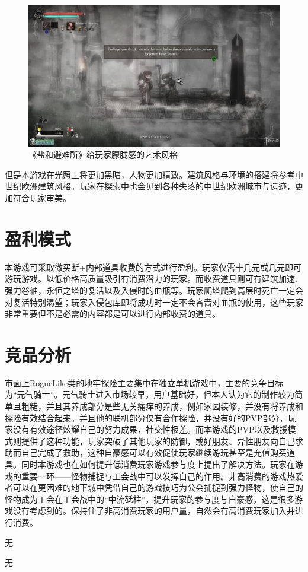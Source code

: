 \documentclass[UTF8,AutoFakeBold=1,AutoFakeSlant,zihao=-4]{cucthesis}
\begin{document}
\begin{figure}[ht]
    \centering
    \includegraphics[scale=1.0]{imgs/美术风格02.jpg}    
    \caption{《盐和避难所》给玩家朦胧感的艺术风格}
\end{figure}

但是本游戏在光照上将更加黑暗，人物更加精致。建筑风格与环境的搭建将参考中世纪欧洲建筑风格。玩家在探索中也会见到各种失落的中世纪欧洲城市与遗迹，更加符合玩家审美。


\section{盈利模式}
本游戏可采取微买断+内部道具收费的方式进行盈利。玩家仅需十几元或几元即可游玩游戏。以低价格高质量吸引有消费潜力的玩家。而收费道具则可有建筑加速、强力卷轴，永恒之塔的复活以及入侵时的血瓶等。玩家爬塔爬到高层时死亡一定会对复活特别渴望；玩家入侵包库即将成功时一定不会吝啬对血瓶的使用，这些玩家非常重要但不是必需的内容都是可以进行内部收费的道具。

\section{竞品分析}
市面上RogueLike类的地牢探险主要集中在独立单机游戏中，主要的竞争目标为“元气骑士”。元气骑士进入市场较早，用户基础好，但本人认为它的制作较为简单且粗糙，并且其养成部分是些无关痛痒的养成，例如家园装修，并没有将养成和探险有效结合起来。并且他的联机部分仅有合作探险，并没有好的PVP部分，玩家没有有效途径炫耀自己的努力成果，社交性极差。而本游戏的PVP以及救援模式则提供了这种功能，玩家突破了其他玩家的防御，或好朋友、异性朋友向自己求助而自己完成了救助，这种自豪感可以有效促使玩家继续游玩甚至是充值购买道具。同时本游戏也在如何提升低消费玩家游戏参与度上提出了解决方法。玩家在游戏的重要一环——怪物捕捉与工会战中可以发挥自己的作用。非高消费的游戏热爱者可以在更困难的地下城中凭借自己的游戏技巧为公会捕捉到强力怪物，使自己的怪物成为工会在工会战中的“中流砥柱”，提升玩家的参与度与自豪感，这是很多游戏没有考虑到的。保持住了非高消费玩家的用户量，自然会有高消费玩家加入并进行消费。


\begin{references}
    
\end{references}

\appendixformat     %
无\cite{bib01}

无\cite{bib02}
\end{document}
